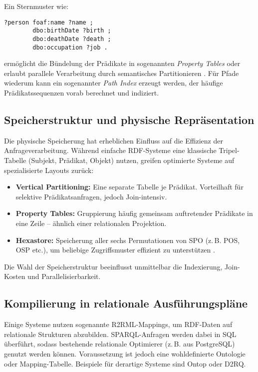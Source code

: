 \documentclass[12pt]{article}
\begin{document}
Ein Sternmuster wie:

\begin{lstlisting}[caption=Sternförmiges SPARQL-Muster]
?person foaf:name ?name ;
        dbo:birthDate ?birth ;
        dbo:deathDate ?death ;
        dbo:occupation ?job .
\end{lstlisting}

ermöglicht die Bündelung der Prädikate in sogenannten \textit{Property Tables} oder erlaubt parallele Verarbeitung durch semantisches Partitionieren \cite{akhtar2019structure}. Für Pfade wiederum kann ein sogenannter \textit{Path Index} erzeugt werden, der häufige Prädikatssequenzen vorab berechnet und indiziert.

\subsection{Speicherstruktur und physische Repräsentation}

Die physische Speicherung hat erheblichen Einfluss auf die Effizienz der Anfrageverarbeitung. Während einfache RDF-Systeme eine klassische Tripel-Tabelle (Subjekt, Prädikat, Objekt) nutzen, greifen optimierte Systeme auf spezialisierte Layouts zurück:

\begin{itemize}
    \item \textbf{Vertical Partitioning:} Eine separate Tabelle je Prädikat. Vorteilhaft für selektive Prädikatsanfragen, jedoch Join-intensiv.
    \item \textbf{Property Tables:} Gruppierung häufig gemeinsam auftretender Prädikate in eine Zeile – ähnlich einer relationalen Projektion.
    \item \textbf{Hexastore:} Speicherung aller sechs Permutationen von SPO (z.\,B. POS, OSP etc.), um beliebige Zugriffsmuster effizient zu unterstützen \cite{weiss2008hexastore}.
\end{itemize}

Die Wahl der Speicherstruktur beeinflusst unmittelbar die Indexierung, Join-Kosten und Parallelisierbarkeit.

\subsection{Kompilierung in relationale Ausführungspläne}

Einige Systeme nutzen sogenannte R2RML-Mappings, um RDF-Daten auf relationale Strukturen abzubilden. SPARQL-Anfragen werden dabei in SQL überführt, sodass bestehende relationale Optimierer (z.\,B. aus PostgreSQL) genutzt werden können. Voraussetzung ist jedoch eine wohldefinierte Ontologie oder Mapping-Tabelle. Beispiele für derartige Systeme sind Ontop oder D2RQ.
\end{document}
